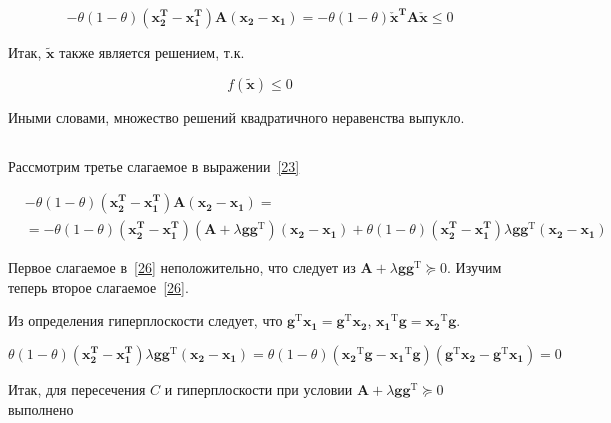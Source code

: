 	\begin{equation}
	-\theta(1-\theta) (\mathbf{x_2^T} - \mathbf{x_1^T})\mathbf{A} (\mathbf{x_2} -
	\mathbf{x_1}) =- \theta(1-\theta)
	\mathbf{\check{x}^T}\mathbf{A}\mathbf{\check{x}} \leqslant 0
	\end{equation}
	
	Итак, $\mathbf{\tilde{x}}$ также является решением, т.к.
	
	\begin{equation}
	f(\mathbf{\tilde{x}}) \leqslant 0
	\end{equation}
	
	Иными словами, множество решений квадратичного неравенства выпукло.
	
	\subsection{}
	
	Рассмотрим третье слагаемое в выражении~\eqref{23}
	
	\begin{equation}
	\label{26}
	\begin{split}
&	-\theta(1-\theta) (\mathbf{x_2^T} - \mathbf{x_1^T})\mathbf{A} (\mathbf{x_2} -
	\mathbf{x_1}) =\\
	&= -\theta(1-\theta) (\mathbf{x_2^T} - \mathbf{x_1^T})(\mathbf{A} + \lambda \mathbf{g}\mathbf{g}^\text{T}) (\mathbf{x_2} -
	\mathbf{x_1}) +\theta(1-\theta) (\mathbf{x_2^T} - \mathbf{x_1^T}) \lambda \mathbf{g}\mathbf{g}^\text{T} (\mathbf{x_2} -
	\mathbf{x_1})
	\end{split} 
	\end{equation}
	
	Первое слагаемое в~\eqref{26} неположительно, что следует из $\mathbf{A} + \lambda \mathbf{g}\mathbf{g}^\text{T} \succeq 0$. Изучим теперь второе слагаемое~\eqref{26}.
	
	Из определения гиперплоскости следует, что $\mathbf{g}^\text{T}\mathbf{x_1} = \mathbf{g}^\text{T}\mathbf{x_2}$, $\mathbf{x_1}^\text{T}\mathbf{g} = \mathbf{x_2}^\text{T}\mathbf{g}$.
	
	\begin{equation}
	\theta(1-\theta) (\mathbf{x_2^T} - \mathbf{x_1^T}) \lambda \mathbf{g}\mathbf{g}^\text{T} (\mathbf{x_2} -\mathbf{x_1}) = \theta(1-\theta)  ( \mathbf{x_2}^\text{T}\mathbf{g} - \mathbf{x_1}^\text{T}\mathbf{g}) (\mathbf{g}^\text{T} \mathbf{x_2} - \mathbf{g}^\text{T} \mathbf{x_1})=0
	\end{equation}
	
	Итак, для пересечения $C$ и гиперплоскости при условии $\mathbf{A} + \lambda \mathbf{g}\mathbf{g}^\text{T} \succeq 0$ выполнено 
	
